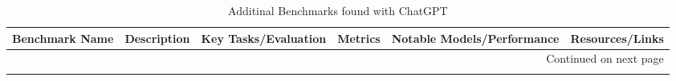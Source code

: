 
\begin{landscape} %
\setlength\LTleft{-2in}     %
\setlength\LTright{-2in}  
\onecolumn

\begin{longtable}{|p{3.5cm}|p{5.5cm}|p{4cm}|p{1.8cm}|p{3.2cm}|p{2.7cm}|}
\caption{Additinal Benchmarks found with ChatGPT}
\label{tab:science-longtable-from-chatgpt}
\\
\hline
\textbf{Benchmark Name} & \textbf{Description} & \textbf{Key Tasks/Evaluation} & \textbf{Metrics} & \textbf{Notable Models/Performance} & \textbf{Resources/Links} \\
\hline
\endhead
\hline
\multicolumn{6}{|r|}{{Continued on next page}} \\
\hline
\endfoot
\hline
\endlastfoot



\end{longtable}
\end{landscape}
